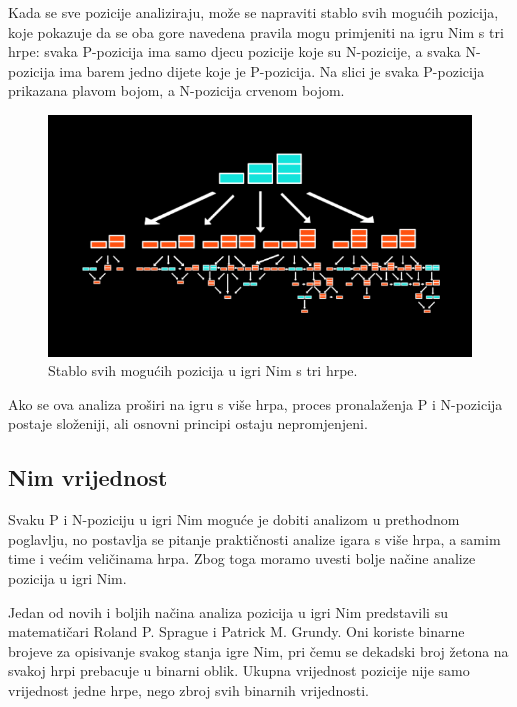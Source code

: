 Kada se sve pozicije analiziraju, može se napraviti stablo svih mogućih pozicija, koje pokazuje da se oba gore navedena pravila mogu primjeniti na igru Nim s tri hrpe: svaka P-pozicija ima samo djecu pozicije koje su N-pozicije, a svaka N-pozicija ima barem jedno dijete koje je P-pozicija. Na slici je svaka P-pozicija prikazana plavom bojom, a N-pozicija crvenom bojom.

\begin{figure}[H]
\centering
\includegraphics[]{slike-analiza/slika4.png}
\caption{Stablo svih mogućih pozicija u igri Nim s tri hrpe.}
\label{}
\end{figure}

Ako se ova analiza proširi na igru s više hrpa, proces pronalaženja P i N-pozicija postaje složeniji, ali osnovni principi ostaju nepromjenjeni. 



\subsection*{Nim vrijednost}

Svaku P i N-poziciju u igri Nim moguće je dobiti analizom u prethodnom poglavlju, no postavlja se pitanje praktičnosti analize igara s više hrpa, a samim time i većim veličinama hrpa. Zbog toga moramo uvesti bolje načine analize pozicija u igri Nim.

Jedan od novih i boljih načina analiza pozicija u igri Nim predstavili su matematičari Roland P. Sprague i Patrick M. Grundy.\cite{2008gametheoryferguson} Oni koriste binarne brojeve za opisivanje svakog stanja igre Nim, pri čemu se dekadski broj žetona na svakoj hrpi prebacuje u binarni oblik. Ukupna vrijednost pozicije nije samo vrijednost jedne hrpe, nego zbroj svih binarnih vrijednosti.

